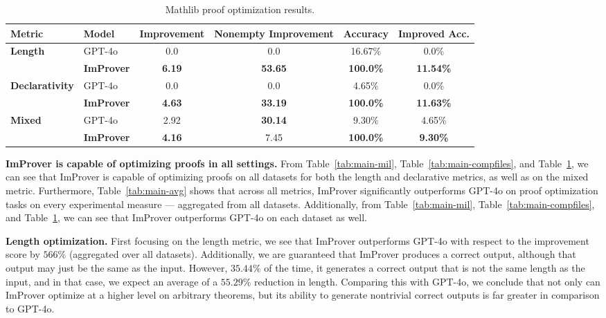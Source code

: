 \begin{table}[h]
\caption{Mathlib proof optimization results.}
\label{tab:main-lib}
\centering
\small
\begin{tabular}{ll|cccc}
\toprule
Metric & Model & Improvement & Nonempty Improvement & Accuracy & Improved Acc.\\
\midrule
\multirow{2}{*}{\textbf{Length}} & GPT-4o & 0.0 & 0.0 & 16.67\% & 0.0\% \\
 & \textbf{ImProver} & \textbf{6.19} & \textbf{53.65} & \textbf{100.0\%} & \textbf{11.54\%} \\
\midrule
\multirow{2}{*}{\textbf{Declarativity}} & GPT-4o & 0.0 & 0.0 & 4.65\% & 0.0\% \\
 & \textbf{ImProver} & \textbf{4.63} & \textbf{33.19} & \textbf{100.0\%} & \textbf{11.63\%} \\
\midrule
\multirow{2}{*}{\textbf{Mixed}} & GPT-4o & 2.92 & \textbf{30.14} & 9.30\% & 4.65\% \\
 & \textbf{ImProver} & \textbf{4.16} & 7.45 & \textbf{100.0\%} & \textbf{9.30\%} \\
\bottomrule
\end{tabular}
\end{table}

\textbf{ImProver is capable of optimizing proofs in all settings.} From Table~\ref{tab:main-mil}, Table~\ref{tab:main-compfiles}, and Table~\ref{tab:main-lib}, we can see that ImProver is capable of optimizing proofs on all datasets for both the length and declarative metrics, as well as on the mixed metric. Furthermore, Table~\ref{tab:main-avg} shows that across all metrics, ImProver significantly outperforms GPT-4o on proof optimization tasks on every experimental measure --- aggregated from all datasets. Additionally, from Table~\ref{tab:main-mil}, Table~\ref{tab:main-compfiles}, and Table~\ref{tab:main-lib}, we can see that ImProver outperforms GPT-4o on each dataset as well.

\textbf{Length optimization.} First focusing on the length metric, we see that ImProver outperforms GPT-4o with respect to the improvement score by $566\%$ (aggregated over all datasets). Additionally, we are guaranteed that ImProver produces a correct output, although that output may just be the same as the input. However, $35.44\%$ of the time, it generates a correct output that is not the same length as the input, and in that case, we expect an average of a $55.29\%$ reduction in length. Comparing this with GPT-4o, we conclude that not only can ImProver optimize at a higher level on arbitrary theorems, but its ability to generate nontrivial correct outputs is far greater in comparison to GPT-4o.

